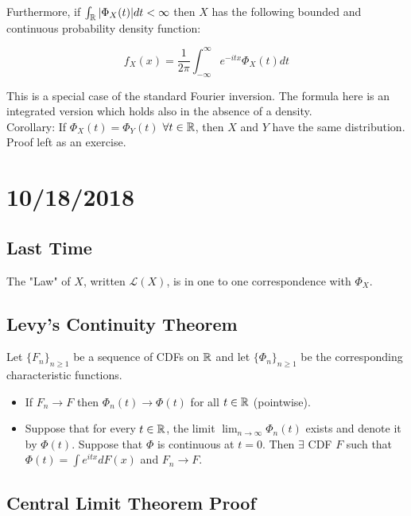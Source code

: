 \documentclass[english, 11pt]{article}
\begin{document}
Furthermore, if $\int_{{\mathbb{R}}} |\Phi_X(t)|dt < \infty$ then $X$ has the following bounded and continuous probability density function:

\[f_X(x) = \frac{1}{2\pi} \int_{-\infty}^\infty e^{-itx} \Phi_X(t)dt\]

This is a special case of the standard Fourier inversion. The formula here is an integrated version which holds also in the absence of a density.\\

Corollary: If $\Phi_X(t) = \Phi_Y(t)$ $\forall t \in {\mathbb{R}}$, then $X$ and $Y$ have the same distribution.\\

Proof left as an exercise.

\section{10/18/2018}

\subsection{Last Time}

The "Law" of $X$, written $\mathcal{L}(X)$, is in one to one correspondence with $\Phi_X$.\\

\subsection{Levy's Continuity Theorem}
Let $\{F_n\}_{n \geq 1}$ be a sequence of CDFs on ${\mathbb{R}}$ and let $\{\Phi_n\}_{n \geq 1}$ be the corresponding characteristic functions.\\

\begin{itemize}
	\item If $F_n \to F$ then $\Phi_n(t) \to \Phi(t)$ for all $t \in {\mathbb{R}}$ (pointwise).
	\item Suppose that for every $t \in {\mathbb{R}}$, the limit $\lim_{n \to \infty} \Phi_n(t)$ exists and denote it by $\Phi(t)$. Suppose that $\Phi$ is continuous at $t = 0$. Then $\exists$ CDF $F$ such that $\Phi(t) = \int e^{itx} dF(x)$ and $F_n \to F$.
\end{itemize}

\subsection{Central Limit Theorem Proof}
\end{document}
